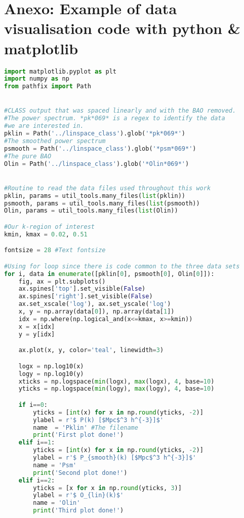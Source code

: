 \chapter*{Anexo: Example of data visualisation code with python \& matplotlib}

\renewcommand{\baselinestretch}{1}
\begin{lstlisting}[language=python]
import matplotlib.pyplot as plt
import numpy as np
from pathfix import Path


#CLASS output that was spaced linearly and with the BAO removed.
#The power spectrum. *pk*069* is a regex to identify the data
#we are interested in.
pklin = Path('../linspace_class').glob('*pk*069*') 
#The smoothed power spectrum
psmooth = Path('../linspace_class').glob('*psm*069*') 
#The pure BAO
Olin = Path('../linspace_class').glob('*Olin*069*') 


#Routine to read the data files used throughout this work
pklin, params = util_tools.many_files(list(pklin))
psmooth, params = util_tools.many_files(list(psmooth))
Olin, params = util_tools.many_files(list(Olin))

#Our k-region of interest
kmin, kmax = 0.02, 0.51

fontsize = 28 #Text fontsize

#Using for loop since there is code common to the three data sets
for i, data in enumerate([pklin[0], psmooth[0], Olin[0]]):
    fig, ax = plt.subplots()
    ax.spines['top'].set_visible(False)
    ax.spines['right'].set_visible(False)
    ax.set_xscale('log'), ax.set_yscale('log')
    x, y = np.array(data[0]), np.array(data[1])
    idx = np.where(np.logical_and(x<=kmax, x>=kmin))
    x = x[idx]
    y = y[idx]

    ax.plot(x, y, color='teal', linewidth=3)

    logx = np.log10(x)
    logy = np.log10(y)
    xticks = np.logspace(min(logx), max(logx), 4, base=10)
    yticks = np.logspace(min(logy), max(logy), 4, base=10)

    if i==0:
        yticks = [int(x) for x in np.round(yticks, -2)]
        ylabel = r'$ P(k) [$Mpc$^3 h^{-3}]$' 
        name  = 'Pklin' #The filename
        print('First plot done!')
    elif i==1:
        yticks = [int(x) for x in np.round(yticks, -2)]
        ylabel = r'$ P_{smooth}(k) [$Mpc$^3 h^{-3}]$' 
        name = 'Psm'
        print('Second plot done!')
    elif i==2:
        yticks = [x for x in np.round(yticks, 3)]
        ylabel = r'$ O_{lin}(k)$'
        name = 'Olin'
        print('Third plot done!')


\end{lstlisting}
